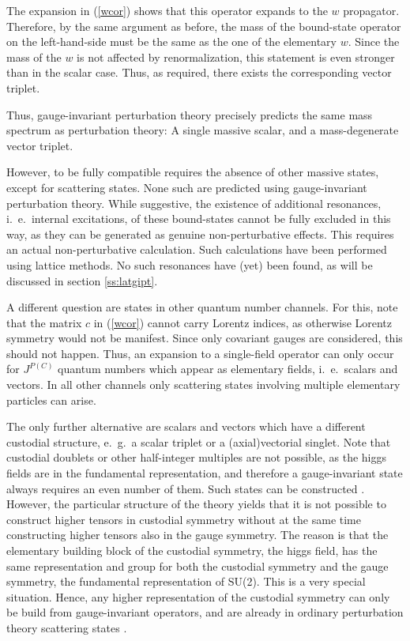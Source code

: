 \documentclass[final,12pt,3p,longtitle]{elsarticle}
\newcommand*{\pref}[1]{(\ref{#1})}
\newcommand*{\1}{1\!\!\!\bot}
\begin{document}
The expansion in \pref{wcor} shows that this operator expands to the $w$ propagator. Therefore, by the same argument as before, the mass of the bound-state operator on the left-hand-side must be the same as the one of the elementary $w$. Since the mass of the $w$ is not affected by renormalization, this statement is even stronger than in the scalar case. Thus, as required, there exists the corresponding vector triplet.

Thus, gauge-invariant perturbation theory precisely predicts the same mass spectrum as perturbation theory: A single massive scalar, and a mass-degenerate vector triplet.

However, to be fully compatible requires the absence of other massive states, except for scattering states. None such are predicted using gauge-invariant perturbation theory. While suggestive, the existence of additional resonances, i.\ e.\ internal excitations, of these bound-states cannot be fully excluded in this way, as they can be generated as genuine non-perturbative effects. This requires an actual non-perturbative calculation. Such calculations have been performed using lattice methods. No such resonances have (yet) been found, as will be discussed in section \ref{ss:latgipt}.

A different question are states in other quantum number channels. For this, note that the matrix $c$ in \pref{wcor} cannot carry Lorentz indices, as otherwise Lorentz symmetry would not be manifest. Since only covariant gauges are considered, this should not happen. Thus, an expansion to a single-field operator can only occur for $J^{P(C)}$ quantum numbers which appear as elementary fields, i.\ e.\ scalars and vectors. In all other channels only scattering states involving multiple elementary particles can arise.

The only further alternative are scalars and vectors which have a different custodial structure, e.\ g.\ a scalar triplet or a (axial)vectorial singlet. Note that custodial doublets or other half-integer multiples are not possible, as the higgs fields are in the fundamental representation, and therefore a gauge-invariant state always requires an even number of them. Such states can be constructed \cite{Wurtz:2013ova}. However, the particular structure of the theory yields that it is not possible to construct higher tensors in custodial symmetry without at the same time constructing higher tensors also in the gauge symmetry. The reason is that the elementary building block of the custodial symmetry, the higgs field, has the same representation and group for both the custodial symmetry and the gauge symmetry, the fundamental representation of SU(2). This is a very special situation. Hence, any higher representation of the custodial symmetry can only be build from gauge-invariant operators, and are already in ordinary perturbation theory scattering states \cite{Wurtz:2013ova}.
\end{document}
